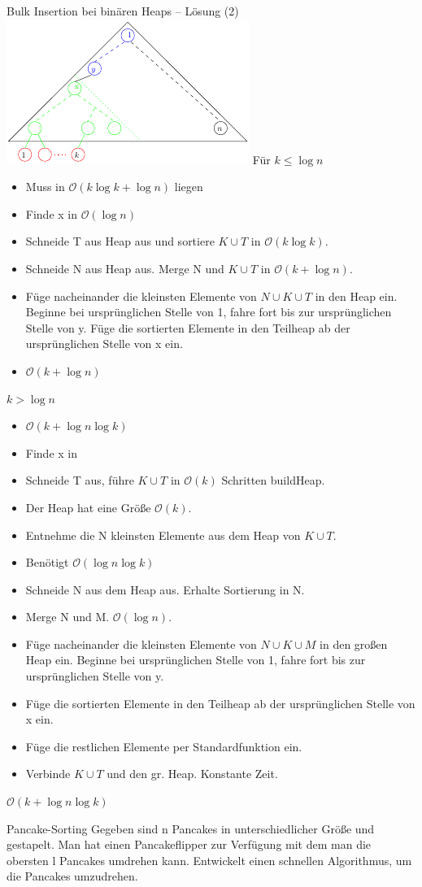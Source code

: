 \documentclass[18pt]{beamer}
\newcommand{\Oh}{\mathcal{O}}
\begin{document}
\begin{frame}{Bulk Insertion bei binären Heaps -- Lösung (2)}
\includegraphics[scale=0.5]{bulkheap}
Für $k \leq \log n$
\begin{itemize}
 \item Muss in $\Oh(k \log k + \log n)$ liegen
 \item Finde x in $\Oh(\log n)$
 \item Schneide T aus Heap aus und sortiere $K \cup T$ in $\Oh(k \log k)$.
 \item Schneide N aus Heap aus. Merge N und $K \cup T$ in $\Oh(k + \log n)$.
 \item Füge nacheinander die kleinsten Elemente von $N \cup K \cup T$ in den 
 Heap ein. Beginne bei ursprünglichen Stelle von 1, fahre fort bis zur ursprünglichen Stelle von y.
 Füge die sortierten Elemente in den Teilheap ab der ursprünglichen Stelle von x ein.
 
 \item $\Oh(k + \log n)$
 
\end{itemize}
\end{frame}

\begin{frame}
 $k > \log n$
 \begin{itemize}
  \item $\Oh(k + \log n \log k)$
  \item Finde x in
  \item Schneide T aus, führe $K \cup T$ in $\Oh(k)$ Schritten buildHeap.
  \item Der Heap hat eine Größe $\Oh(k)$.
  \item Entnehme die N kleinsten Elemente aus dem Heap von $K \cup T$.
  \item Benötigt $\Oh(\log n \log k)$
  \item Schneide N aus dem Heap aus. Erhalte Sortierung in N.
  \item Merge N und M. $\Oh(\log n)$.
 \item Füge nacheinander die kleinsten Elemente von $N \cup K \cup M$ in den 
 großen Heap ein. Beginne bei ursprünglichen Stelle von 1, fahre fort bis zur ursprünglichen Stelle von y.
 \item Füge die sortierten Elemente in den Teilheap ab der ursprünglichen Stelle von x ein.
 \item Füge die restlichen Elemente per Standardfunktion ein.
 \item Verbinde $K \cup T$ und den gr. Heap. Konstante Zeit.
 \end{itemize}
$\Oh(k + \log n \log k)$
\end{frame}


\begin{frame}{Pancake-Sorting}
 Gegeben sind n Pancakes in unterschiedlicher Größe und gestapelt. Man hat einen Pancakeflipper zur Verfügung mit dem man
 die obersten l Pancakes umdrehen kann.
 Entwickelt einen schnellen Algorithmus, um die Pancakes umzudrehen.
\end{frame}
\end{document}
